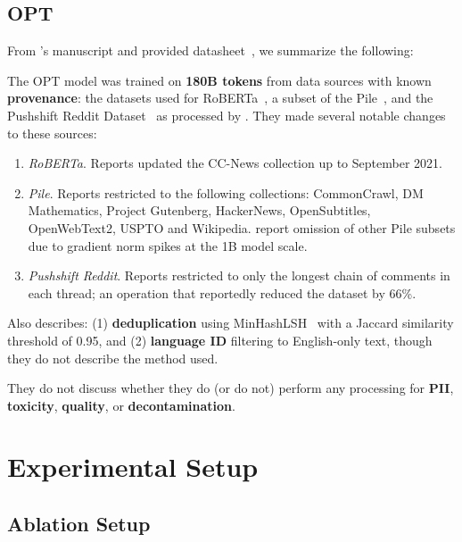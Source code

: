 \documentclass{article}
\begin{document}
\subsection{OPT~\citep{zhang-2022-language}}\label{appendix:llm:opt} 

From \citet{zhang-2022-language}'s manuscript and provided datasheet~\citep{gebru2021datasheets}, we summarize the following:

The OPT model was trained on \textbf{180B tokens} from data sources with known \textbf{provenance}: the datasets used for RoBERTa~\citep{Liu2019RoBERTaAR}, a subset of the Pile~\citep{Gao2020ThePA}, and the Pushshift Reddit Dataset~\citep{pushshift} as processed by \citep{roller-etal-2021-recipes}. They made several notable changes to these sources:

\begin{enumerate}
    \item \emph{RoBERTa}.  Reports updated the CC-News collection up to September 2021.
    \item \emph{Pile}. Reports restricted to the following collections: CommonCrawl, DM Mathematics, Project Gutenberg, HackerNews, OpenSubtitles, OpenWebText2, USPTO and Wikipedia. \citep{zhang-2022-language} report omission of other Pile subsets due to gradient norm spikes at the 1B model scale.
    \item \emph{Pushshift Reddit}. 
    Reports restricted to only the longest chain of comments in each thread; an operation that reportedly reduced the dataset by 66\%.
\end{enumerate}

Also describes: (1) \textbf{deduplication} using MinHashLSH~\citep{rajaraman-ullman-minhash-lsh} with a Jaccard similarity threshold of 0.95, and (2) \textbf{language ID} filtering to English-only text, though they do not describe the method used. 

They do not discuss whether they do (or do not) perform any processing for \textbf{PII}, \textbf{toxicity}, \textbf{quality}, or \textbf{decontamination}. 

\section{Experimental Setup}
\label{sec:setup}

\subsection{Ablation Setup}
\label{sec:setup:abl}
\end{document}
